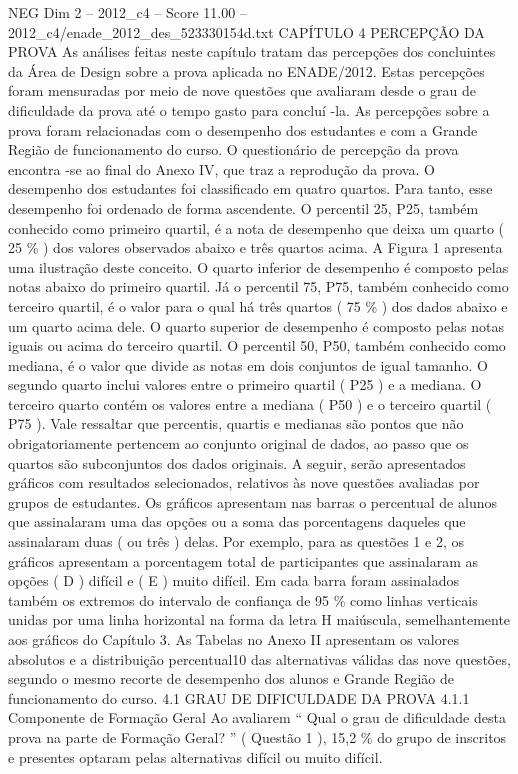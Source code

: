 \begin{textsample}{NEG Dim 2 – 2012\_c4 – Score 11.00 – 2012\_c4/enade\_2012\_des\_523330154d.txt}  \label{ex:f2_neg_334}
CAPÍTULO 4 PERCEPÇÃO DA PROVA As análises feitas neste capítulo tratam das percepções dos concluintes da Área de Design sobre a prova aplicada no ENADE/2012.
Estas percepções foram mensuradas por meio de nove questões que avaliaram desde o grau de dificuldade da prova até o tempo gasto para concluí -la.
As percepções sobre a prova foram relacionadas com o desempenho dos estudantes e com a Grande Região de funcionamento do curso.
O questionário de percepção da prova encontra -se ao final do Anexo IV, que traz a reprodução da prova.
O desempenho dos estudantes foi classificado em quatro quartos.
Para tanto, esse desempenho foi ordenado de forma ascendente.
O percentil 25, P25, também conhecido como primeiro quartil, é a nota de desempenho que deixa um quarto ( 25 \% ) dos valores observados abaixo e três quartos acima.
A Figura 1 apresenta uma ilustração deste conceito.
O quarto inferior de desempenho é composto pelas notas abaixo do primeiro quartil.
Já o percentil 75, P75, também conhecido como terceiro quartil, é o valor para o qual há três quartos ( 75 \% ) dos dados abaixo e um quarto acima dele.
O quarto superior de desempenho é composto pelas notas iguais ou acima do terceiro quartil.
O percentil 50, P50, também conhecido como mediana, é o valor que divide as notas em dois conjuntos de igual tamanho.
O segundo quarto inclui valores entre o primeiro quartil ( P25 ) e a mediana.
O terceiro quarto contém os valores entre a mediana ( P50 ) e o terceiro quartil ( P75 ).
Vale ressaltar que percentis, quartis e medianas são pontos que não obrigatoriamente pertencem ao conjunto original de dados, ao passo que os quartos são subconjuntos dos dados originais.
A seguir, serão apresentados gráficos com resultados selecionados, relativos às nove questões avaliadas por grupos de estudantes.
Os gráficos apresentam nas barras o percentual de alunos que assinalaram uma das opções ou a soma das porcentagens daqueles que assinalaram duas ( ou três ) delas.
Por exemplo, para as questões 1 e 2, os gráficos apresentam a porcentagem total de participantes que assinalaram as opções ( D ) difícil e ( E ) muito difícil.
Em cada barra foram assinalados também os extremos do intervalo de confiança de 95 \% como linhas verticais unidas por uma linha horizontal na forma da letra H maiúscula, semelhantemente aos gráficos do Capítulo 3.
As Tabelas no Anexo II apresentam os valores absolutos e a distribuição percentual10 das alternativas válidas das nove questões, segundo o mesmo recorte de desempenho dos alunos e Grande Região de funcionamento do curso. 4.1 GRAU DE DIFICULDADE DA PROVA 4.1.1 Componente de Formação Geral Ao avaliarem “ Qual o grau de dificuldade desta prova na parte de Formação Geral? ” ( Questão 1 ), 15,2 \% do grupo de inscritos e presentes optaram pelas alternativas difícil ou muito difícil.

\end{textsample}

